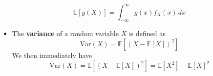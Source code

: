 \documentclass{article}
\begin{document}
\begin{itemize}
    \begin{equation}
        \mathbb{E}[g(X)] = \int_{-\infty}^{\infty} g(x) f_X(x)\,dx
    \end{equation}
    \item The \textbf{variance} of a random variable $X$ is defined as
    \begin{equation}
        \text{Var}(X) = \mathbb{E}[(X - \mathbb{E}[X])^2]
    \end{equation}
    We then immediately have
    \begin{equation}
        \text{Var}(X) = \mathbb{E}[(X - \mathbb{E}[X])^2] = \mathbb{E}[X^2] - \mathbb{E}[X]^2
    \end{equation}
\end{itemize}
\end{document}
